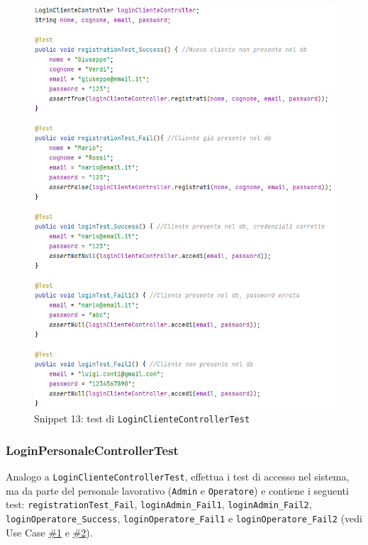 \documentclass{article}
\newcommand{\code}[1]{\texttt{#1}}
\begin{document}
\begin{figure}[H]
    \centering
    \includegraphics[scale=0.5]{resources/images/Snippets/snippet_LoginClienteControllerTest.png}
    \captionsetup{labelformat=empty,labelsep=none}
    \caption{Snippet 13: test di \code{LoginClienteControllerTest}}
    \label{fig:snippet_LoginClienteControllerTest}
\end{figure}

\newpage

\subsubsection{LoginPersonaleControllerTest}
Analogo a \code{LoginClienteControllerTest}, effettua i test di accesso nel sistema, ma da parte del personale lavorativo (\code{Admin} e \code{Operatore}) e contiene i seguenti test: \code{registrationTest\_Fail}, \code{loginAdmin\_Fail1}, \code{loginAdmin\_Fail2}, \code{loginOperatore\_Success}, \code{loginOperatore\_Fail1} e \code{loginOperatore\_Fail2}
(vedi Use Case \hyperref[use_case_1]{\#1} e \hyperref[use_case_2]{\#2}).
\end{document}
